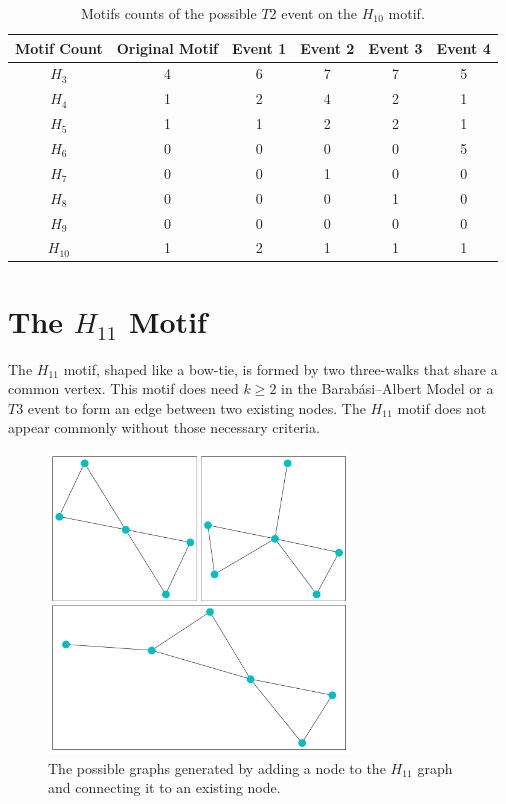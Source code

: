 \begin{table}
    \centering
    \begin{tabular}{||c c c c c c ||} 
    \hline
    Motif Count & Original Motif & Event 1 & Event 2 & Event 3  & Event 4 \\ [0.5ex] 
    \hline\hline
    $H_{3}$ & 4 & 6 & 7 & 7  & 5\\
    \hline
    $H_{4}$ & 1 & 2 & 4 & 2  & 1\\
    \hline
    $H_{5}$ & 1 & 1 & 2 & 2 & 1\\
    \hline
    $H_{6}$ & 0 & 0 & 0 & 0  & 5\\
    \hline
    $H_{7}$ & 0 & 0 & 1 & 0 & 0 \\
    \hline
    $H_{8}$ & 0 & 0 & 0 & 1 & 0 \\
    \hline
    $H_{9}$ & 0 & 0 & 0 & 0  & 0 \\
    \hline
    $H_{10}$ & 1 & 2 & 1 & 1 & 1 \\
    \hline
   \end{tabular}
   \caption{Motifs counts of the possible $T2$ event on the $H_{10}$ motif.}
   \label{table:8}
\end{table}

\FloatBarrier

\section{The \texorpdfstring{$H_{11}$}{H11} Motif}
The $H_{11}$ motif, shaped like a bow-tie, is formed by two three-walks that share a common
vertex. This motif does need $k \geq 2$ in the Barabási–Albert Model or
 a $T3$ event to form an edge between two existing nodes. The $H_{11}$ motif does not appear 
 commonly without those necessary criteria.

\begin{figure}[!ht]
    \includegraphics[width=8cm]{Images/H11_evolution.png}
    \centering
    \caption{The possible graphs generated by adding a node to the $H_{11}$ graph 
    and connecting it to an existing node.}
\end{figure}

